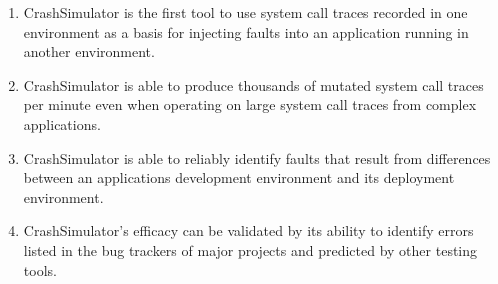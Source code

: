     \begin{enumerate}
        \item{CrashSimulator is the first tool to use system call traces recorded in one environment as a basis for
            injecting faults into an application running in another environment.}
        \item{CrashSimulator is able to produce thousands of mutated system call traces per minute even when operating
            on large system call traces from complex applications.}
        \item{CrashSimulator is able to reliably identify faults that result from differences between an applications
            development environment and its deployment environment.}
        \item{CrashSimulator's efficacy can be validated by its ability to identify errors listed in the bug trackers of
            major projects and predicted by other testing tools.}
    \end{enumerate}
